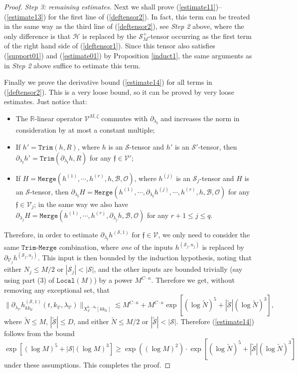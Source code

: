 \documentclass[11 pt,reqno]{amsart}
\theoremstyle{definition}
\theoremstyle{remark}
\numberwithin{equation}{section}
\newcommand{\Sc}{\mathcal{S}}
\newcommand{\Uc}{\mathcal{U}}
\newcommand{\Vc}{\mathcal{V}}
\newcommand{\Rb}{\mathbb{R}}
\newcommand{\Hc}{\mathcal{H}}
\newcommand{\ff}{\mathfrak{f}}
\newcommand{\Bs}{\mathscr{B}}
\newcommand{\Os}{\mathscr{O}}
\newcommand{\Vs}{\mathscr{V}}
\begin{document}
{\begin{proof}
\emph{Step 3: remaining estimates.} Next we shall prove (\ref{estimate11})--(\ref{estimate13}) for the first line of (\ref{deftensor2}). In fact, this term can be treated in the same way as the third line of (\ref{deftensor2}), see \emph{Step 2} above, where the only difference is that $\Hc$ is replaced by the $\Sc_M^+$-tensor occurring as the first term of the right hand side of (\ref{deftensor1}). Since this tensor also satisfies (\ref{support01}) and (\ref{estimate01}) by Proposition \ref{induct1}, the same arguments as in \emph{Step 2} above suffice to estimate this term.

Finally we prove the derivative bound (\ref{estimate14}) for all terms in (\ref{deftensor2}). This is a very loose bound, so it can be proved by very loose estimates. Just notice that:
\begin{itemize}
\item The $\Rb$-linear operator $\Vs^{M,\zeta}$ commutes with $\partial_{\lambda_\ff}$ and increases the norm in consideration by at most a constant multiple;
\item If $h'=\mathtt{Trim}(h,R)$, where $h$ is an $\Sc$-tensor and $h'$ is an $\Sc'$-tensor, then $\partial_{\lambda_\ff}h'=\mathtt{Trim}(\partial_{\lambda_\ff}h,R)$ for any $\ff\in\Vc'$;
\item If $H=\mathtt{Merge}(h^{(1)},\cdots,h^{(r)},h,\Bs,\Os)$, where $h^{(j)}$ is an $\Sc_j$-tensor and $H$ is an $\Sc$-tensor, then $\partial_{\lambda_\ff}H=\mathtt{Merge}(h^{(1)},\cdots,\partial_{\lambda_\ff}h^{(j)},\cdots,h^{(r)},h,\Bs,\Os)$ for any $\ff\in\Vc_j$; in the same way we also have $\partial_{\lambda_j}H=\mathtt{Merge}(h^{(1)},\cdots,h^{(r)},\partial_{\lambda_j}h,\Bs,\Os)$ for any $r+1\leq j\leq q$.
\end{itemize} Therefore, in order to estimate $\partial_{\lambda_\ff}h^{(\Sc,1)}$ for $\ff\in\Vc$, we only need to consider the same $\mathtt{Trim}$-$\mathtt{Merge}$ combination, where \emph{one} of the inputs $h^{(\Sc_j,n_j)}$ is replaced by $\partial_{\Vc_j}h^{(\Sc_j,n_j)}$. This input is then bounded by the induction hypothesis, noting that either $N_j\leq M/2$ or $|\Sc_j|<|\Sc|$, and the other inputs are bounded trivially (say using part (3) of $\mathtt{Local}(M)$) by a power $M^{C\cdot\kappa}$. Therefore we get, without removing any exceptional set, that
\[\|\partial_{\lambda_\Vc}h_{kk_\Uc}^{(\Sc,1)}(t,k_\Vc,\lambda_\Vc)\|_{X_\Vc^{b,-b_0}[kk_\Uc]}\lesssim M^{C\cdot\kappa}+M^{C\cdot\kappa}\exp[(\log \widetilde{N})^5+|\widetilde{\Sc}|(\log \widetilde{N})^3],\] where $\widetilde{N}\leq M$, $|\widetilde{\Sc}|\leq D$, and either $\widetilde{N}\leq M/2$ or $|\widetilde{\Sc}|<|\Sc|$. Therefore (\ref{estimate14}) follows from the bound \[\exp[(\log M)^5+|\Sc|(\log M)^3]\geq \exp((\log M)^2)\cdot\exp[(\log \widetilde{N})^5+|\widetilde{\Sc}|(\log \widetilde{N})^3]\] under these assumptions. This completes the proof.
\end{proof}
}
\end{document}
